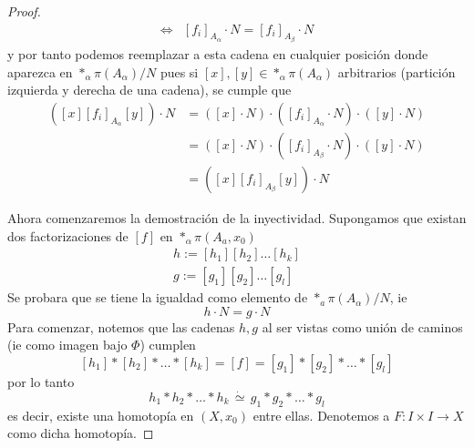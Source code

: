 \begin{proof}
\begin{align*}
    \iff &[f_i]_{A_\alpha} \cdot N = [f_i]_{A_\beta} \cdot N
  \end{align*}
  y por tanto podemos reemplazar a esta cadena en cualquier posición
  donde aparezca en \(*_\alpha \pi (A_\alpha) / N\) pues si \([x] , [y] \in
  *_\alpha \pi(A_\alpha)\) arbitrarios (partición izquierda y derecha de
  una cadena), se cumple que
  \begin{align*}
    \left( [x] [f_i]_{A_\alpha} [y] \right) \cdot N
    &= \left( [x] \cdot N \right) \cdot \left([f_i]_{A_\alpha} \cdot N
       \right) \cdot \left( [y] \cdot N \right) \\
    &= \left( [x] \cdot N \right) \cdot \left(
      [f_i]_{A_\beta} \cdot N \right) \cdot \left( [y]
      \cdot N \right) \\
    &= \left( [x] [f_i]_{A_\beta} [y] \right) \cdot N
  \end{align*}

  Ahora comenzaremos la demostración de la inyectividad. Supongamos
  que existan dos factorizaciones de \([f]\) en
  \(*_\alpha \pi (A_a, x_0)\)
  \begin{gather*}
    h := [h_1][h_2]\dotsc [h_k] \\
    g := [g _1][g _2]\dotsc [g _l]
  \end{gather*}
  Se probara que se tiene la igualdad como elemento de \(*_a \pi
  (A_\alpha) / N\), ie
  \[ h \cdot N = g\cdot N\]
  Para comenzar, notemos que las cadenas \(h,g\) al ser vistas como
  unión de caminos (ie como imagen bajo \(\Phi\)) cumplen
  \[ [h_1] * [h_2] * \dotsc * [h_k] = [f] = [g _1] * [g _2] * \dotsc * [g _l] \]
  por lo tanto
  \[ h_1 * h_2 * \dotsc * h_k \, \dot \simeq \, g _1 * g _2 * \dotsc *
    g _l \]
  es decir, existe una homotopía en \((X,x_0)\) entre ellas. Denotemos
  a \(F : I \times I \to X\) como dicha homotopía.


\end{proof}
